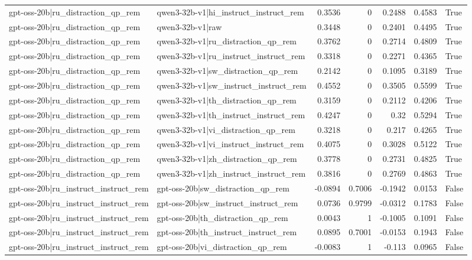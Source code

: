 \begin{table}
\begin{tabular}{l l r r r r l}
gpt-oss-20b|ru_distraction_qp_rem & qwen3-32b-v1|hi_instruct_instruct_rem & 0.3536 & 0 & 0.2488 & 0.4583 & True \\
gpt-oss-20b|ru_distraction_qp_rem & qwen3-32b-v1|raw & 0.3448 & 0 & 0.2401 & 0.4495 & True \\
gpt-oss-20b|ru_distraction_qp_rem & qwen3-32b-v1|ru_distraction_qp_rem & 0.3762 & 0 & 0.2714 & 0.4809 & True \\
gpt-oss-20b|ru_distraction_qp_rem & qwen3-32b-v1|ru_instruct_instruct_rem & 0.3318 & 0 & 0.2271 & 0.4365 & True \\
gpt-oss-20b|ru_distraction_qp_rem & qwen3-32b-v1|sw_distraction_qp_rem & 0.2142 & 0 & 0.1095 & 0.3189 & True \\
gpt-oss-20b|ru_distraction_qp_rem & qwen3-32b-v1|sw_instruct_instruct_rem & 0.4552 & 0 & 0.3505 & 0.5599 & True \\
gpt-oss-20b|ru_distraction_qp_rem & qwen3-32b-v1|th_distraction_qp_rem & 0.3159 & 0 & 0.2112 & 0.4206 & True \\
gpt-oss-20b|ru_distraction_qp_rem & qwen3-32b-v1|th_instruct_instruct_rem & 0.4247 & 0 & 0.32 & 0.5294 & True \\
gpt-oss-20b|ru_distraction_qp_rem & qwen3-32b-v1|vi_distraction_qp_rem & 0.3218 & 0 & 0.217 & 0.4265 & True \\
gpt-oss-20b|ru_distraction_qp_rem & qwen3-32b-v1|vi_instruct_instruct_rem & 0.4075 & 0 & 0.3028 & 0.5122 & True \\
gpt-oss-20b|ru_distraction_qp_rem & qwen3-32b-v1|zh_distraction_qp_rem & 0.3778 & 0 & 0.2731 & 0.4825 & True \\
gpt-oss-20b|ru_distraction_qp_rem & qwen3-32b-v1|zh_instruct_instruct_rem & 0.3816 & 0 & 0.2769 & 0.4863 & True \\
gpt-oss-20b|ru_instruct_instruct_rem & gpt-oss-20b|sw_distraction_qp_rem & -0.0894 & 0.7006 & -0.1942 & 0.0153 & False \\
gpt-oss-20b|ru_instruct_instruct_rem & gpt-oss-20b|sw_instruct_instruct_rem & 0.0736 & 0.9799 & -0.0312 & 0.1783 & False \\
gpt-oss-20b|ru_instruct_instruct_rem & gpt-oss-20b|th_distraction_qp_rem & 0.0043 & 1 & -0.1005 & 0.1091 & False \\
gpt-oss-20b|ru_instruct_instruct_rem & gpt-oss-20b|th_instruct_instruct_rem & 0.0895 & 0.7001 & -0.0153 & 0.1943 & False \\
gpt-oss-20b|ru_instruct_instruct_rem & gpt-oss-20b|vi_distraction_qp_rem & -0.0083 & 1 & -0.113 & 0.0965 & False \\

\end{tabular}
\end{table}
